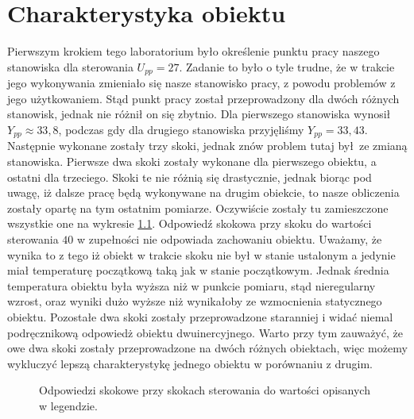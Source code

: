 \chapter{Charakterystyka obiektu}
\label{sec:zad12}
Pierwszym krokiem tego laboratorium było określenie punktu pracy naszego
stanowiska dla sterowania $U_{pp} = 27$. Zadanie to było o tyle trudne, że
w trakcie jego wykonywania zmieniało się nasze stanowisko pracy, z powodu
problemów z jego użytkowaniem. Stąd punkt pracy został przeprowadzony dla
dwóch różnych stanowisk, jednak nie różnił on się zbytnio. Dla pierwszego
stanowiska wynosił $Y_{pp} \approx 33,8$, podczas gdy dla drugiego stanowiska
przyjęliśmy $Y_{pp} = 33,43$. Następnie wykonane zostały trzy skoki, jednak
znów problem tutaj był ze zmianą stanowiska. Pierwsze dwa skoki zostały
wykonane dla pierwszego obiektu, a ostatni dla trzeciego. Skoki te nie
różnią się drastycznie, jednak biorąc pod uwagę, iż dalsze pracę będą wykonywane
na drugim obiekcie, to nasze obliczenia zostały opartę na tym ostatnim pomiarze.
Oczywiście zostały tu zamieszczone wszystkie one na wykresie \ref{fig:skoki}.
Odpowiedź skokowa przy skoku do wartości sterowania $40$ w zupełności nie
odpowiada zachowaniu obiektu. Uważamy, że wynika to z tego iż obiekt w trakcie
skoku nie był w stanie ustalonym a jedynie miał temperaturę początkową taką
jak w stanie początkowym. Jednak średnia temperatura obiektu była wyższa
niż w punkcie pomiaru, stąd nieregularny wzrost, oraz wyniki dużo wyższe niż
wynikałoby ze wzmocnienia statycznego obiektu. Pozostałe dwa skoki zostały
przeprowadzone staranniej i widać niemal podręcznikową odpowiedż obiektu
dwuinercyjnego. Warto przy tym zauważyć, że owe dwa skoki zostały przeprowadzone
na dwóch różnych obiektach, więc możemy wykluczyć lepszą charakterystykę
jednego obiektu w porównaniu z drugim.

\begin{figure}[tb]
\centering
{}
\caption{Odpowiedzi skokowe przy skokach sterowania do wartości opisanych w
legendzie.}
\label{fig:skoki}
\end{figure}
